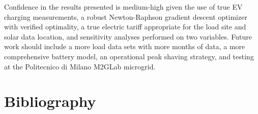 \documentclass[journal,article,submit,pdftex,moreauthors]{Definitions/mdpi}
\begin{document}
Confidence in the results presented is medium-high given the use of true
EV charging measurements, a robust Newton-Raphson gradient descent
optimizer with verified optimality, a true electric tariff appropriate
for the load site and solar data location, and sensitivity analyses
performed on two variables. Future work should include a more load data
sets with more months of data, a more comprehensive battery model, an
operational peak shaving strategy, and testing at the
Politecnico di Milano M2GLab microgrid. \cite{Wagner2019}

\section{Bibliography}\label{bibliography}%


\end{document}
